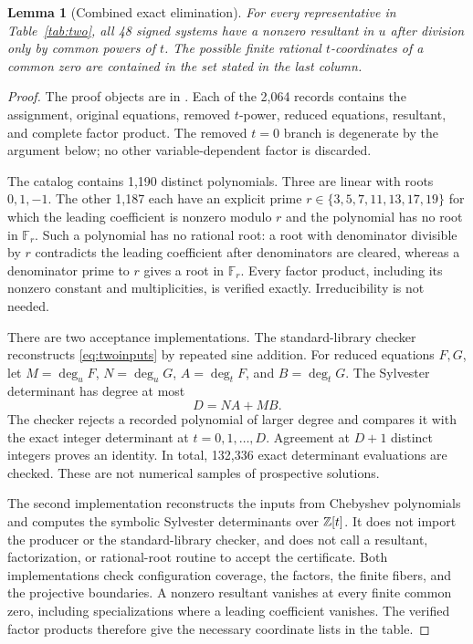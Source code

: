 \documentclass[11pt,letterpaper]{article}
\newtheorem{lemma}[theorem]{Lemma}
\theoremstyle{definition}\newtheorem{definition}[theorem]{Definition}
\theoremstyle{remark}\newtheorem{remark}[theorem]{Remark}
\newcommand{\F}{\mathbb F}\newcommand{\Pone}{\mathbf P^1}
\begin{document}
\begin{lemma}[Combined exact elimination]\label{lem:combined}
For every representative in Table~\ref{tab:two}, all 48 signed systems have a nonzero resultant in $u$ after division only by common powers of $t$. The possible finite rational $t$-coordinates of a common zero are contained in the set stated in the last column.
\end{lemma}
\begin{proof}
The proof objects are in . Each of the 2,064 records contains the assignment, original equations, removed $t$-power, reduced equations, resultant, and complete factor product. The removed $t=0$ branch is degenerate by the argument below; no other variable-dependent factor is discarded.

The catalog contains 1,190 distinct polynomials. Three are linear with roots $0,1,-1$. The other 1,187 each have an explicit prime $r\in\{3,5,7,11,13,17,19\}$ for which the leading coefficient is nonzero modulo $r$ and the polynomial has no root in $\F_r$. Such a polynomial has no rational root: a root with denominator divisible by $r$ contradicts the leading coefficient after denominators are cleared, whereas a denominator prime to $r$ gives a root in $\F_r$. Every factor product, including its nonzero constant and multiplicities, is verified exactly. Irreducibility is not needed.

There are two acceptance implementations. The standard-library checker reconstructs \eqref{eq:twoinputs} by repeated sine addition. For reduced equations $F,G$, let $M=\deg_uF$, $N=\deg_uG$, $A=\deg_tF$, and $B=\deg_tG$. The Sylvester determinant has degree at most
\[
D=NA+MB.
\]
The checker rejects a recorded polynomial of larger degree and compares it with the exact integer determinant at $t=0,1,\ldots,D$. Agreement at $D+1$ distinct integers proves an identity. In total, 132,336 exact determinant evaluations are checked. These are not numerical samples of prospective solutions.

The second implementation reconstructs the inputs from Chebyshev polynomials and computes the symbolic Sylvester determinants over $\mathbb Z[t]$. It does not import the producer or the standard-library checker, and does not call a resultant, factorization, or rational-root routine to accept the certificate. Both implementations check configuration coverage, the factors, the finite fibers, and the projective boundaries. A nonzero resultant vanishes at every finite common zero, including specializations where a leading coefficient vanishes. The verified factor products therefore give the necessary coordinate lists in the table.
\end{proof}
\end{document}
